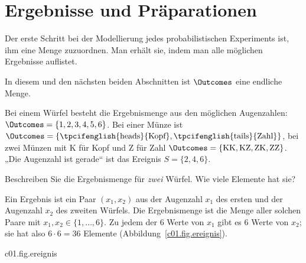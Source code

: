 \section{Ergebnisse und Präparationen}\label{c01.s1}

Der erste Schritt bei der Modellierung jedes probabilistischen Experiments ist, ihm eine
Menge zuzuordnen. Man erhält sie, indem man alle möglichen Ergebnisse auflistet.


In diesem und den nächsten beiden Abschnitten ist $\Outcomes$ eine endliche Menge.

\begin{example}\label{c01.ex.wuerfel}
  Bei einem Würfel besteht die Ergebnismenge aus den möglichen Augenzahlen:
  $\Outcomes = \{1, 2, 3, 4, 5, 6\}$. Bei einer Münze ist
  $\Outcomes = \{\text{\tpcifenglish{heads}{Kopf}}, \text{\tpcifenglish{tails}{Zahl}}\}$,
  bei zwei Münzen mit K für Kopf und Z für Zahl
  $\Outcomes = \{\text{KK}, \text{KZ}, \text{ZK}, \text{ZZ}\}$. „Die Augenzahl ist gerade“
  ist das Ereignis $S = \{2, 4, 6\}$.
\end{example}

\begin{exercise}\label{c01.exc.zwei-wuerfel}
  Beschreiben Sie die Ergebnismenge für \emph{zwei} Würfel. Wie viele Elemente hat sie?
\end{exercise}
\begin{solution}
  Ein Ergebnis ist ein Paar $(x_1, x_2)$ aus der Augenzahl $x_1$ des ersten und der
  Augenzahl $x_2$ des zweiten Würfels. Die Ergebnismenge ist die Menge aller solchen Paare
  mit $x_1, x_2 \in \{1, \dots, 6\}$. Zu jedem der $6$ Werte von $x_1$ gibt es $6$ Werte
  von $x_2$; sie hat also $6 \cdot 6 = 36$ Elemente
  (Abbildung~\ref{c01.fig.ereignis}).
\end{solution}

\begin{tpcfigure}{c01.fig.ereignis}
  \caption{Ergebnismengen und Ereignisse. (a) Ein Würfel: sechs Ergebnisse; das Ereignis
    „gerade Augenzahl“ ist die Menge der schraffierten Felder. (b) Zwei Würfel: Jeder
    Punkt ist ein Paar $(x_1, x_2)$, zusammen $36$ Ergebnisse. Das Ereignis „die
    Augensumme ist $7$“ besteht aus den sechs mit Quadraten markierten Paaren.}
\end{tpcfigure}

